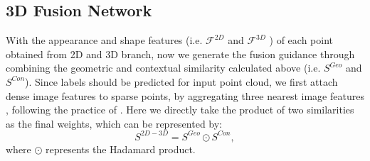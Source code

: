 \documentclass[letterpaper, 10 pt, conference]{ieeeconf}
\begin{document}
\begin{table}[t]
\caption{Comparison with multi-view and point-based methods on ScanNetV2 Benchmark}
\begin{center}
\vspace{-8mm}
\end{center}

\end{table}

\subsection{3D Fusion Network}




With the appearance and shape features (i.e. $\mathcal{F}^{2D}$ and $\mathcal{F}^{3D}$ ) of each point obtained from 2D and 3D branch, now we generate the fusion guidance through combining the geometric and contextual similarity calculated above (i.e. $S^{Geo}$ and $S^{Con}$).  Since labels should be predicted for input point cloud, we first attach dense image features to sparse points, by aggregating three nearest image  features , following the practice of \cite{jaritz2019multi}. 
Here we directly take the product of two similarities as the final weights, which can be represented by:
\begin{equation}
S^{2D-3D} = S^{Geo} \odot S^{Con},
\end{equation}
where $\odot$ represents the Hadamard product. 
\end{document}
